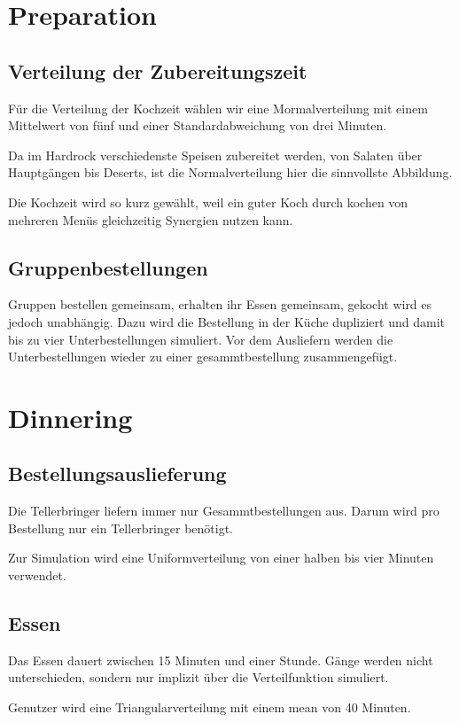 \documentclass[ngerman,a4paper,12pt]{scrreprt}
\begin{document}
	
	\section{Preparation}	
		\subsection{Verteilung der Zubereitungszeit}
			Für die Verteilung der Kochzeit wählen wir eine Mormalverteilung mit einem Mittelwert von fünf und einer Standardabweichung von drei Minuten.
	
			Da im Hardrock verschiedenste Speisen zubereitet werden, von Salaten über Hauptgängen bis Deserts, ist die Normalverteilung hier die sinnvollste Abbildung.
	
			Die Kochzeit wird so kurz gewählt, weil ein guter Koch durch kochen von mehreren Menüs gleichzeitig Synergien nutzen kann.
	
	
		\subsection{Gruppenbestellungen}
			Gruppen bestellen gemeinsam, erhalten ihr Essen gemeinsam, gekocht wird es jedoch unabhängig. Dazu wird die Bestellung in der Küche dupliziert und damit bis zu vier Unterbestellungen simuliert. Vor dem Ausliefern werden die Unterbestellungen wieder zu einer gesammtbestellung zusammengefügt.
			
			
	\section{Dinnering}
		\subsection{Bestellungsauslieferung}					
			Die Tellerbringer liefern immer nur Gesammtbestellungen aus. Darum wird pro Bestellung nur ein Tellerbringer benötigt.
			
			Zur Simulation wird eine Uniformverteilung von einer halben bis vier Minuten verwendet.


		\subsection{Essen}
			Das Essen dauert zwischen 15 Minuten und einer Stunde. Gänge werden nicht unterschieden, sondern nur implizit über die Verteilfunktion simuliert.
			
			Genutzer wird eine Triangularverteilung mit einem mean von 40 Minuten.\\
			
\end{document}

